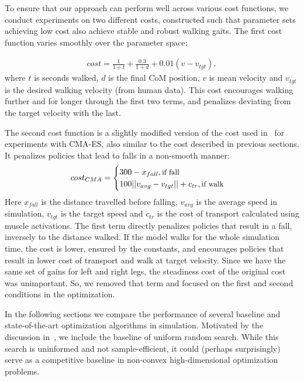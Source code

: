 To ensure that our approach can perform well across various cost functions, we conduct experiments on two different costs, constructed such that parameter sets achieving low cost also achieve stable and robust walking gaits. The first cost function varies smoothly over the parameter space:
 
\begin{align}
cost = \frac{1}{1+t} + \frac{0.3}{1+d} + 0.01 (v-v_{tgt}),
\end{align}
where $t$ is seconds walked, $d$ is the final CoM position, $v$ is mean velocity and $v_{tgt}$ is the desired walking velocity (from human data). This cost encourages walking further and for longer through the first two terms, and penalizes deviating from the target velocity with the last.

The second cost function is a slightly modified version of the cost used in~\cite{song2015neural} for experiments with \mbox{CMA-ES}, also similar to the cost described in previous sections. It penalizes policies that lead to falls in a non-smooth manner:
\begin{align}
cost_{CMA} = 		
    \begin{cases}
		300 - x_{fall} , \text{\small{if fall}} \\
		100 ||v_{avg} - v_{tgt}|| + c_{tr}, \text{\small{if walk}}\\
	\end{cases}
\end{align}
Here $x_{fall}$ is the distance travelled before falling, $v_{avg}$ is the average speed in simulation, $v_{tgt}$ is the target speed and $c_{tr}$ is the cost of transport calculated using muscle activations. The first term directly penalizes policies that result in a fall, inversely to the distance walked. If the model walks for the whole simulation time, the cost is lower, ensured by the constants, and encourages policies that result in lower cost of transport and walk at target velocity. Since we have the same set of gains for left and right legs, the steadiness cost of the original cost~\cite{song2015neural} was unimportant. So, we removed that term and focused on the first and second conditions in the optimization.

In the following sections we compare the performance of several baseline and state-of-the-art optimization algorithms in simulation. Motivated by the discussion in~\cite{calandra2016bayesian}, we include the baseline of uniform random search. While this search is uninformed and not sample-efficient, it could (perhaps surprisingly) serve as a competitive baseline in non-convex high-dimensional optimization problems. 

